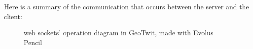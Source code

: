 \documentclass[a4paper,11pt]{report}
\begin{document}
\newpage

Here is a summary of the communication that occurs between the server and the client:
\begin{figure}[H]
\vspace{-5pt}
\begin{center}
\vspace{-5pt}
\caption{web sockets' operation diagram in GeoTwit, made with Evolus Pencil}
\end{center}
\end{figure}
\end{document}
